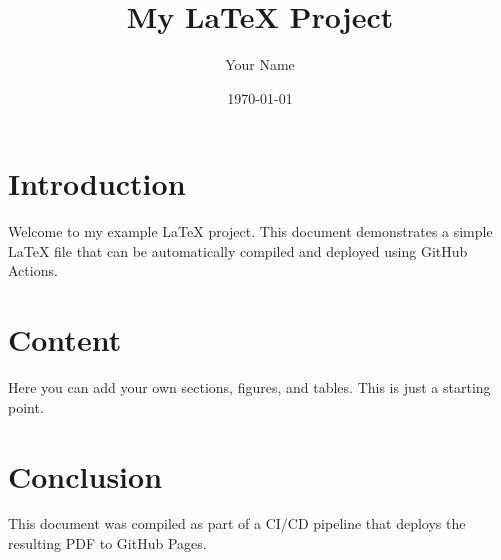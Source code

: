 \documentclass{article}
\title{My LaTeX Project}
\author{Your Name}
\date{\today}
\begin{document}
\maketitle

\section{Introduction}

Welcome to my example LaTeX project. This document demonstrates a simple LaTeX file that can be automatically compiled and deployed using GitHub Actions.

\lipsum[1] %

\section{Content}

Here you can add your own sections, figures, and tables. This is just a starting point.

\lipsum[2] %

\section{Conclusion}

This document was compiled as part of a CI/CD pipeline that deploys the resulting PDF to GitHub Pages.
\end{document}
